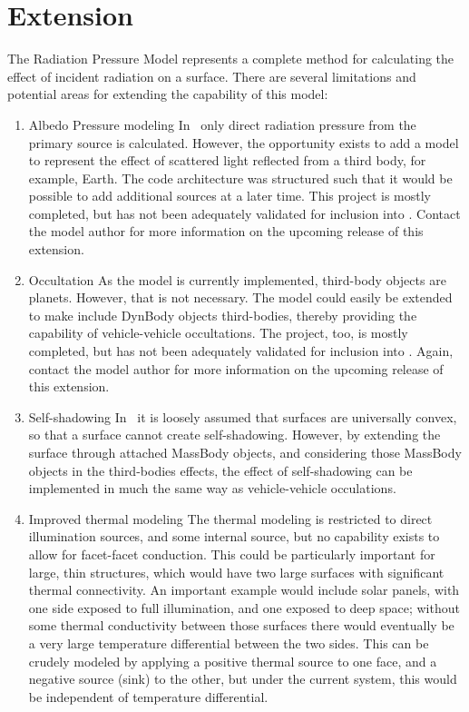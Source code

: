 %
%
%

 \section{Extension}
The Radiation Pressure Model represents a complete method for calculating the effect of incident radiation on a surface.  There are several limitations and potential areas for extending the capability of this model:

\begin{enumerate}
\item{Albedo Pressure modeling} \newline
In \JEODid\, only direct radiation pressure from the primary source is calculated.  However, the opportunity exists to add a model to represent the effect of scattered light reflected from a third body, for example, Earth.  The code architecture was structured such that it would be possible to add additional sources at a later time.  This project is mostly completed, but has not been adequately validated for inclusion into \JEODid.  Contact the model author for more information on the upcoming release of this extension.
\item{Occultation} \newline
As the model is currently implemented, third-body objects are planets.  However, that is not necessary.  The model could easily be extended to make include DynBody objects third-bodies, thereby providing the capability of vehicle-vehicle occultations.  The project, too, is mostly completed, but has not been adequately validated for inclusion into \JEODid.  Again, contact the model author for more information on the upcoming release of this extension.
\item{Self-shadowing} \newline
In \JEODid\, it is loosely assumed that surfaces are universally convex, so that a surface cannot create self-shadowing.  However, by extending the surface through attached MassBody objects, and considering those MassBody objects in the third-bodies effects, the effect of self-shadowing can be implemented in much the same way as vehicle-vehicle occulations.
\item{Improved thermal modeling} \newline
The thermal modeling is restricted to direct illumination sources, and some internal source, but no capability exists to allow for facet-facet conduction.  This could be particularly important for large, thin structures, which would have two large surfaces with significant thermal connectivity.  An important example would include solar panels, with one side exposed to full illumination, and one exposed to deep space; without some thermal conductivity between those surfaces there would eventually be a very large temperature differential between the two sides.  This can be crudely modeled by applying a positive thermal source to one face, and a negative source (sink) to the other, but under the current system, this would be independent of temperature differential.
\end{enumerate}
